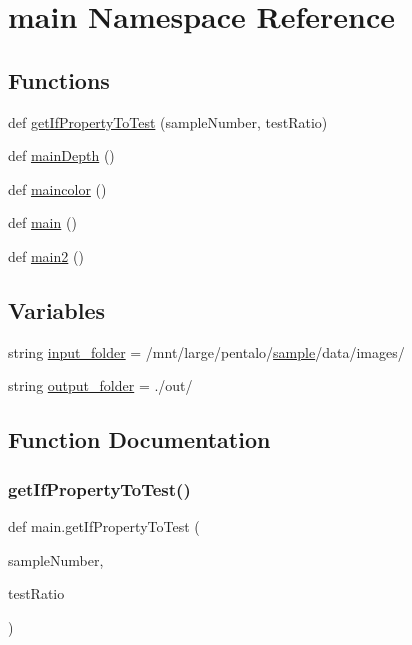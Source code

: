 \hypertarget{namespacemain}{}\section{main Namespace Reference}
\label{namespacemain}
\subsection*{Functions}
\begin{DoxyCompactItemize}
\item 
def \hyperlink{namespacemain_a79057ea90b8e9ec6d19aa60668910f91}{get\+If\+Property\+To\+Test} (sample\+Number, test\+Ratio)
\item 
def \hyperlink{namespacemain_aec122b8c24a18ea2a68a0a902474a048}{main\+Depth} ()
\item 
def \hyperlink{namespacemain_a4dd127bf5aff068f91de46dfc931a62f}{maincolor} ()
\item 
def \hyperlink{namespacemain_af613cea4cba4fb7de8e40896b3368945}{main} ()
\item 
def \hyperlink{namespacemain_a80860d59bdf4a47bf23d077b5646b8c5}{main2} ()
\end{DoxyCompactItemize}
\subsection*{Variables}
\begin{DoxyCompactItemize}
\item 
string \hyperlink{namespacemain_a562ba179d38eb6abbb9a1c3cc2b71de9}{input\+\_\+folder} = \textquotesingle{}/mnt/large/pentalo/\hyperlink{classsample_generator_1_1sample_1_1sample}{sample}/data/images/\textquotesingle{}
\item 
string \hyperlink{namespacemain_a272479fd8bcaf9c622140557411310ab}{output\+\_\+folder} = \textquotesingle{}./out/\textquotesingle{}
\end{DoxyCompactItemize}


\subsection{Function Documentation}
\mbox{\label{namespacemain_a79057ea90b8e9ec6d19aa60668910f91}} 
\subsubsection{\texorpdfstring{get\+If\+Property\+To\+Test()}{getIfPropertyToTest()}}
{\footnotesize\ttfamily def main.\+get\+If\+Property\+To\+Test (\begin{DoxyParamCaption}\item[{}]{sample\+Number,  }\item[{}]{test\+Ratio }\end{DoxyParamCaption})}

